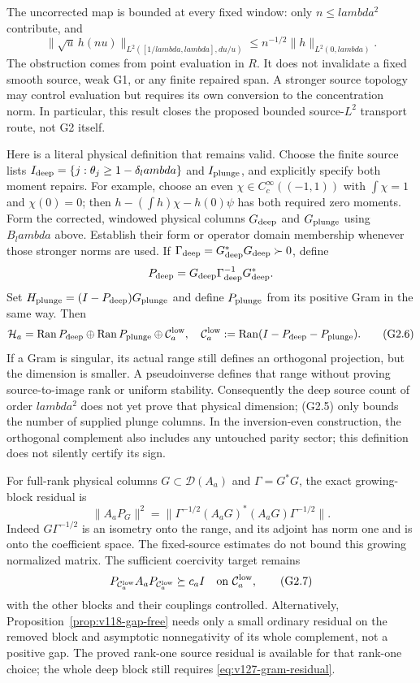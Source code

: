 \documentclass[11pt]{article}
\def\lambda{lambda}%
\theoremstyle{remark}
\begin{document}
The uncorrected map is bounded at every fixed window: only
$n\le\lambda^2$ contribute, and
\[
 \|\sqrt u\,h(nu)\|_{L^2([1/\lambda,\lambda],du/u)}
 \le n^{-1/2}\|h\|_{L^2(0,\lambda)}.
\]
The obstruction comes from point evaluation in $R$. It does not
invalidate a fixed smooth source, weak G1, or any finite repaired
span. A stronger source topology may control evaluation but requires
its own conversion to the concentration norm. In particular, this
result closes the proposed bounded source-$L^2$ transport route, not
G2 itself.

Here is a literal physical definition that remains valid. Choose the
finite source lists $I_{\rm deep}=\{j:\theta_j\ge1-\delta_\lambda\}$
and $I_{\rm plunge}$, and explicitly specify both moment repairs.
For example, choose an even $\chi\in C_c^\infty((-1,1))$ with
$\int\chi=1$ and $\chi(0)=0$; then
$h-(\int h)\chi-h(0)\psi$ has both required zero moments.
Form the corrected, windowed physical columns $G_{\rm deep}$ and
$G_{\rm plunge}$ using $B_\lambda$ above. Establish their form or
operator domain membership whenever those stronger norms are used.
If $\Gamma_{\rm deep}=G_{\rm deep}^*G_{\rm deep}\succ0$, define
\[
 P_{\rm deep}=G_{\rm deep}\Gamma_{\rm deep}^{-1}G_{\rm deep}^*.
\]
Set $H_{\rm plunge}=(I-P_{\rm deep})G_{\rm plunge}$ and define
$P_{\rm plunge}$ from its positive Gram in the same way. Then
\[
 \mathcal H_a=\operatorname{Ran}P_{\rm deep}\oplus
 \operatorname{Ran}P_{\rm plunge}\oplus\mathcal C_a^{\rm low},
 \quad
 \mathcal C_a^{\rm low}:=\operatorname{Ran}(I-P_{\rm deep}-P_{\rm plunge}).
 \tag{G2.6}
\]
If a Gram is singular, its actual range still defines an orthogonal
projection, but the dimension is smaller. A pseudoinverse defines that
range without proving source-to-image rank or uniform stability.
Consequently the deep source count of order $\lambda^2$ does not yet
prove that physical dimension; (G2.5) only bounds the number of supplied
plunge columns. In the inversion-even construction, the orthogonal
complement also includes any untouched parity sector; this definition
does not silently certify its sign.

For full-rank physical columns $G\subset\mathcal D(A_a)$ and
$\Gamma=G^*G$, the exact growing-block residual is
\begin{equation}\label{eq:v127-gram-residual}
 \|A_aP_G\|^2
 =\|\Gamma^{-1/2}(A_aG)^*(A_aG)\Gamma^{-1/2}\|.
\end{equation}
Indeed $G\Gamma^{-1/2}$ is an isometry onto the range, and its
adjoint has norm one and is onto the coefficient space. The
fixed-source estimates do not bound this growing normalized matrix.
The sufficient coercivity target remains
\[
 P_{\mathcal C_a^{\rm low}}A_aP_{\mathcal C_a^{\rm low}}\succeq c_a I
 \quad\hbox{on }\mathcal C_a^{\rm low},
 \tag{G2.7}
\]
with the other blocks and their couplings controlled. Alternatively,
Proposition~\ref{prop:v118-gap-free} needs only a small ordinary
residual on the removed block and asymptotic nonnegativity of its
whole complement, not a positive gap. The proved rank-one source
residual is available for that rank-one choice; the whole deep block
still requires \eqref{eq:v127-gram-residual}.
\end{document}
